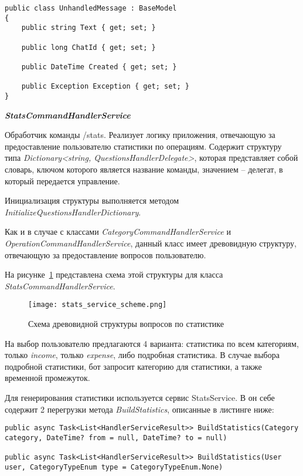 \lstset{style=sharpc}
\begin{lstlisting}
public class UnhandledMessage : BaseModel
{
	public string Text { get; set; }

	public long ChatId { get; set; }

	public DateTime Created { get; set; }

	public Exception Exception { get; set; }
}
\end{lstlisting}

\textbf{\emph{StatsCommandHandlerService}}

Обработчик команды /stats. Реализует логику приложения, отвечающую за предоставление пользователю статистики по операциям. Содержит структуру типа \emph{Dictionary<string, QuestionsHandlerDelegate>}, которая представляет собой словарь, ключом которого является название команды, значением – делегат, в который передается управление.

Инициализация структуры выполняется методом \linebreak \emph{InitializeQuestionsHandlerDictionary}.

Как и в случае с классами \emph{CategoryCommandHandlerService} и \linebreak \emph{OperationCommandHandlerService}, данный класс имеет древовидную структуру, отвечающую за предоставление вопросов пользователю.

На рисунке~\ref{fig:design:server:stats_service_scheme} представлена схема этой структуры для класса \linebreak \emph{StatsCommandHandlerService}.

\begin{figure}[!h]
\centering
	\texttt{[image: stats\_service\_scheme.png]}
	\caption{Схема древовидной структуры вопросов по статистике}
	\label{fig:design:server:stats_service_scheme}
\end{figure}

На выбор пользователю предлагаются 4 варианта: статистика по всем категориям, только \emph{income}, только \emph{expense}, либо подробная статистика. В случае выбора подробной статистики, бот запросит категорию для статистики, а также временной промежуток.

Для генерирования статистики используется сервис StatsService. В он себе содержит 2 перегрузки метода \emph{BuildStatistics}, описанные в листинге ниже:

\lstset{style=sharpc}
\begin{lstlisting}
public async Task<List<HandlerServiceResult>> BuildStatistics(Category category, DateTime? from = null, DateTime? to = null)

public async Task<List<HandlerServiceResult>> BuildStatistics(User user, CategoryTypeEnum type = CategoryTypeEnum.None)
\end{lstlisting}

